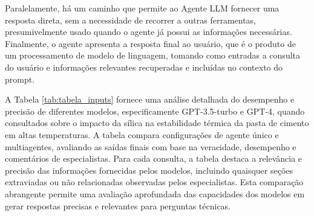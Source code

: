             Paralelamente, há um caminho que permite ao Agente LLM fornecer uma resposta direta, sem a necessidade de recorrer a outras ferramentas, presumivelmente usado quando o agente já possui as informações necessárias. Finalmente, o agente apresenta a resposta final ao usuário, que é o produto de um processamento de modelo de linguagem, tomando como entradas a consulta do usuário e informações relevantes recuperadas e incluídas no contexto do prompt.
            
            A Tabela \ref{tab:tabela_inputs} fornece uma análise detalhada do desempenho e precisão de diferentes modelos, especificamente GPT-3.5-turbo e GPT-4, quando consultados sobre o impacto da sílica na estabilidade térmica da pasta de cimento em altas temperaturas. A tabela compara configurações de agente único e multiagentes, avaliando as saídas finais com base na veracidade, desempenho e comentários de especialistas. Para cada consulta, a tabela destaca a relevância e precisão das informações fornecidas pelos modelos, incluindo quaisquer seções extraviadas ou não relacionadas observadas pelos especialistas. Esta comparação abrangente permite uma avaliação aprofundada das capacidades dos modelos em gerar respostas precisas e relevantes para perguntas técnicas.
            
